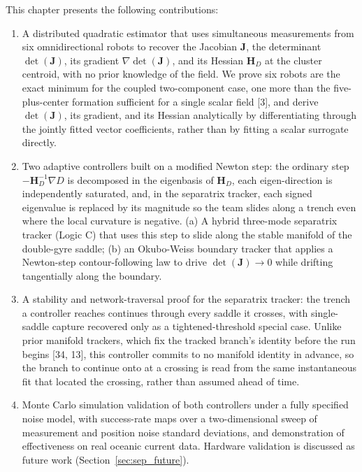 \documentclass[12pt, letterpaper, oneside]{report}
\begin{document}
This chapter presents the following contributions:
\begin{enumerate}
\item A distributed quadratic estimator that uses simultaneous measurements
from six omnidirectional robots to recover the Jacobian $\mathbf{J}$, the
determinant $\det(\mathbf{J})$, its gradient $\nabla\det(\mathbf{J})$, and
its Hessian $\mathbf{H}_D$ at the cluster centroid, with no prior knowledge
of the field. We prove six robots are the exact minimum for the coupled
two-component case, one more than the five-plus-center formation sufficient
for a single scalar field [3], and derive $\det(\mathbf{J})$, its gradient,
and its Hessian analytically by differentiating through the jointly fitted
vector coefficients, rather than by fitting a scalar surrogate directly.
\item Two adaptive controllers built on a modified Newton step: the
ordinary step $-\mathbf{H}_D^{-1}\nabla D$ is decomposed in the eigenbasis
of $\mathbf{H}_D$, each eigen-direction is independently saturated, and, in
the separatrix tracker, each signed eigenvalue is replaced by its magnitude
so the team slides along a trench even where the local curvature is
negative. (a) A hybrid three-mode separatrix tracker (Logic C) that uses
this step to slide along the stable manifold of the double-gyre saddle; (b)
an Okubo-Weiss boundary tracker that applies a Newton-step
contour-following law to drive $\det(\mathbf{J})\to0$ while drifting
tangentially along the boundary.
\item A stability and network-traversal proof for the separatrix tracker:
the trench a controller reaches continues through every saddle it crosses,
with single-saddle capture recovered only as a tightened-threshold special
case. Unlike prior manifold trackers, which fix the tracked branch's
identity before the run begins [34, 13], this controller commits to no
manifold identity in advance, so the branch to continue onto at a crossing
is read from the same instantaneous fit that located the crossing, rather
than assumed ahead of time.
\item Monte Carlo simulation validation of both controllers under a fully
specified noise model, with success-rate maps over a two-dimensional sweep
of measurement and position noise standard deviations, and demonstration
of effectiveness on real oceanic current data. Hardware validation is
discussed as future work (Section~\ref{sec:sep_future}).
\end{enumerate}
\end{document}
